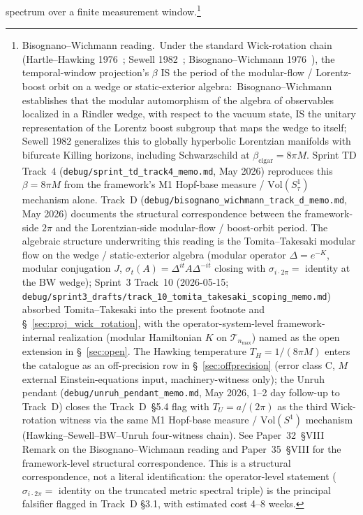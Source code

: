 \documentclass[11pt]{article}
\begin{document}
spectrum over a finite measurement window.\footnote{%
Bisognano--Wichmann reading.\ Under the standard Wick-rotation chain
(Hartle--Hawking 1976~\cite{hartle_hawking1976};
 Sewell 1982~\cite{sewell1982};
 Bisognano--Wichmann 1976~\cite{bisognano_wichmann1976}),
the temporal-window projection's $\beta$ IS the period of the
modular-flow / Lorentz-boost orbit on a wedge or static-exterior
algebra:\ Bisognano--Wichmann establishes that the modular automorphism
of the algebra of observables localized in a Rindler wedge, with
respect to the vacuum state, IS the unitary representation of the
Lorentz boost subgroup that maps the wedge to itself; Sewell 1982
generalizes this to globally hyperbolic Lorentzian manifolds with
bifurcate Killing horizons, including Schwarzschild at
$\beta_{\mathrm{cigar}} = 8\pi M$.  Sprint TD Track~4
(\texttt{debug/sprint\_td\_track4\_memo.md}, May 2026) reproduces this
$\beta = 8\pi M$ from the framework's M1 Hopf-base measure /
$\mathrm{Vol}(S^1_\tau)$ mechanism alone.  Track~D
(\texttt{debug/bisognano\_wichmann\_track\_d\_memo.md}, May 2026)
documents the structural correspondence between the framework-side
$2\pi$ and the Lorentzian-side modular-flow / boost-orbit period.
The algebraic structure underwriting this reading is the
Tomita--Takesaki modular flow on the wedge / static-exterior algebra
(modular operator $\Delta = e^{-K}$, modular conjugation $J$,
$\sigma_t(A) = \Delta^{it}A\Delta^{-it}$ closing with $\sigma_{i\cdot 2\pi}
= $ identity at the BW wedge); Sprint~3 Track~10 (2026-05-15;
\texttt{debug/sprint3\_drafts/track\_10\_tomita\_takesaki\_scoping\_memo.md})
absorbed Tomita--Takesaki into the present footnote and \S~\ref{sec:proj_wick_rotation},
with the operator-system-level framework-internal realization (modular
Hamiltonian $K$ on $\mathcal{T}_{n_{\max}}$) named as the open extension
in \S~\ref{sec:open}.  The
Hawking temperature $T_H = 1/(8\pi M)$ enters the catalogue as an
off-precision row in \S~\ref{sec:offprecision} (error class
C, $M$ external Einstein-equations input, machinery-witness only); the
Unruh pendant (\texttt{debug/unruh\_pendant\_memo.md}, May 2026,
1--2 day follow-up to Track~D) closes the Track~D~\S 5.4 flag with
$T_U = a/(2\pi)$ as the third Wick-rotation witness via the same M1
Hopf-base measure / $\mathrm{Vol}(S^1)$ mechanism (Hawking--Sewell--BW--Unruh
four-witness chain).  See Paper~32~§VIII Remark on the
Bisognano--Wichmann reading and Paper~35~§VIII for the framework-level
structural correspondence.  This is a structural correspondence, not a
literal identification: the operator-level statement
($\sigma_{i\cdot 2\pi} = $ identity on the truncated metric spectral
triple) is the principal falsifier flagged in Track~D \S 3.1, with
estimated cost 4--8 weeks.
}
\end{document}
